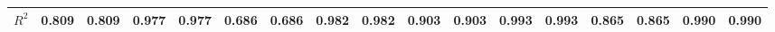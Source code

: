 \begin{tabular}{lllllllllllllllll}
$R^2$                        &                             0.809 &                             0.809 &                            0.977 &                            0.977 &                             0.686 &                             0.686 &                             0.982 &                             0.982 &                             0.903 &                             0.903 &                             0.993 &                             0.993 &                             0.865 &                             0.865 &                            0.990 &                            0.990 \\
\bottomrule
\end{tabular}
